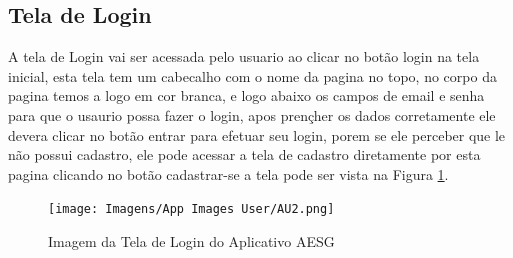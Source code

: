 \documentclass[
    12pt,                   %
    openright,              %
    oneside,                %
    a4paper,                %
    sumario=tradicional,    %
    english,                %
    brazil,                 %
    ]{abntex2}
\begin{document}
        \subsection{Tela de Login}
            A tela de Login vai ser acessada pelo usuario ao clicar no botão login na tela inicial, esta tela tem um cabecalho com o nome da pagina no topo, no corpo da pagina temos a logo em cor branca, e logo abaixo os campos de email e senha para que o usaurio possa fazer o login, apos prençher os dados corretamente ele devera clicar no botão entrar para efetuar seu login, porem se ele perceber que le não possui cadastro, ele pode acessar a tela de cadastro diretamente por esta pagina clicando no botão cadastrar-se a tela pode ser vista na Figura \ref{fig:AppTelaLogin}.
            \begin{figure}[!h]
                \begin{center}
                \centering
                \texttt{[image: Imagens/App Images          User/AU2.png]}
                \end{center}
                \caption[Imagem da Tela de Login do Aplicativo AESG]{ 
                Imagem da Tela de Login do Aplicativo AESG}
                \label{fig:AppTelaLogin}
            \end{figure}
\end{document}
